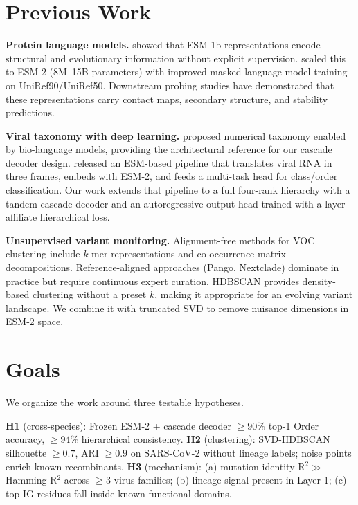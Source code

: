 \documentclass{article}
\begin{document}
\section{Previous Work}
\label{sec:related}

\textbf{Protein language models.} \citet{rives2021esm} showed that ESM-1b representations encode structural and evolutionary information without explicit supervision. \citet{lin2023esm2} scaled this to ESM-2 (8M--15B parameters) with improved masked language model training on UniRef90/UniRef50. Downstream probing studies have demonstrated that these representations carry contact maps, secondary structure, and stability predictions.

\textbf{Viral taxonomy with deep learning.} \citet{deng2024numerical} proposed numerical taxonomy enabled by bio-language models, providing the architectural reference for our cascade decoder design. \citet{passion2025virusproject} released an ESM-based pipeline that translates viral RNA in three frames, embeds with ESM-2, and feeds a multi-task head for class/order classification. Our work extends that pipeline to a full four-rank hierarchy with a tandem cascade decoder and an autoregressive output head trained with a layer-affiliate hierarchical loss.

\textbf{Unsupervised variant monitoring.} Alignment-free methods for VOC clustering include $k$-mer representations \citep{wood2019kraken2} and co-occurrence matrix decompositions. Reference-aligned approaches (Pango, Nextclade) dominate in practice but require continuous expert curation. HDBSCAN \citep{mcinnes2017hdbscan} provides density-based clustering without a preset $k$, making it appropriate for an evolving variant landscape. We combine it with truncated SVD to remove nuisance dimensions in ESM-2 space.


\section{Goals}
\label{sec:goals}

We organize the work around three testable hypotheses.

\textbf{H1} (cross-species): Frozen ESM-2 + cascade decoder $\geq 90\%$ top-1 Order accuracy, $\geq 94\%$ hierarchical consistency.
\textbf{H2} (clustering): SVD-HDBSCAN silhouette $\geq 0.7$, ARI $\geq 0.9$ on SARS-CoV-2 without lineage labels; noise points enrich known recombinants.
\textbf{H3} (mechanism): (a) mutation-identity R$^2 \gg$ Hamming R$^2$ across $\geq 3$ virus families; (b) lineage signal present in Layer 1; (c) top IG residues fall inside known functional domains.
\end{document}

